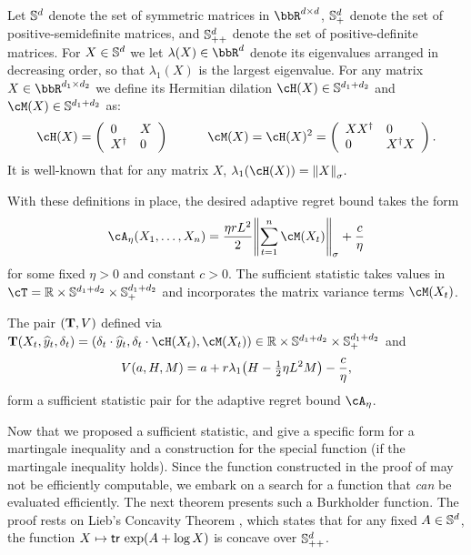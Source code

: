 Let $\mathbb{S}^{d}$ denote the set of symmetric matrices in $\bbR^{d\times{}d}$, $\mathbb{S}^{d}_{+}$ denote the set of positive-semidefinite matrices, and $\mathbb{S}^{d}_{++}$ denote the set of positive-definite matrices. 
For $X\in\mathbb{S}^{d}$ we let $\lambda(X)\in\bbR^{d}$ denote its eigenvalues arranged in decreasing order, so that $\lambda_1(X)$ is the largest eigenvalue. For any matrix $X\in\bbR^{d_1\times{}d_2}$ we define its Hermitian dilation $\cH(X)\in\sym^{d_1+d_2}$ and  $\cM(X) \in\sym^{d_1+d_2}$ as:
\begin{equation}
  \cH(X) = \left(
    \begin{array}{ll}
      0 & X\\
      X^{\trn} & 0
    \end{array}
    \right) ~~~~~~~~~\cM(X) = \cH(X)^{2} = \left(
    \begin{array}{ll}
      XX^{\trn} & 0\\
      0 & X^{\trn}X
    \end{array}
  \right).
  \end{equation}
  It is well-known that for any matrix $X$, $\lambda_{1}(\cH(X)) = \nrm*{X}_{\sigma}.$

With these definitions in place, the desired adaptive regret bound takes the form
\begin{equation}
\cA_{\eta}(X_{1},\ldots,X_{n}) = \frac{\eta{}rL^2}{2}\nrm*{\sum_{t=1}^{n}\cM(X_t)}_{\sigma} + \frac{c}{\eta}
\end{equation}
for some fixed $\eta>0$ and constant $c>0$. The sufficient statistic takes values in  $\cT=\reals\times \sym^{d_1+d_2}\times \sym^{d_1+d_2}_{+}$ and incorporates the matrix variance terms $\cM(X_t)$.



\begin{proposition}
  \label{prop:matrix_sufficient}
  The pair $(\mathbf{T}, V)$ defined via $\suff(X_t,\pred_t,\delta_t) = \left( \delta_t\cdot\pred_t, \delta_t\cdot \cH(X_t), \cM(X_t) \right)\in\reals\times \sym^{d_1+d_2}\times \sym^{d_1+d_2}_{+}$ and
\begin{equation}
\label{eq:matrix_v}
V(a, H, M) = a + r\lambda_1\prn*{H -{\textstyle\frac{1}{2}}\eta{}L^2 M} - \frac{c}{\eta},
\end{equation}
form a sufficient statistic pair for the adaptive regret bound $\cA_{\eta}$.
\end{proposition}
  
Now that we proposed a sufficient statistic,  and  give a specific form for a martingale inequality and a construction for the special function (if the martingale inequality holds). Since the function constructed in the proof of  may not be efficiently computable, we embark on a search for a function that \emph{can} be evaluated efficiently. The next theorem presents such a Burkholder function. The proof rests on Lieb's Concavity Theorem \citep{lieb1973convex}, which states that for any fixed $A\in\mathbb{S}^{d}$, the function $X \mapsto\Tr\,\exp\prn*{A + \log{}X}$ is concave over $\mathbb{S}^{d}_{++}$.
  

